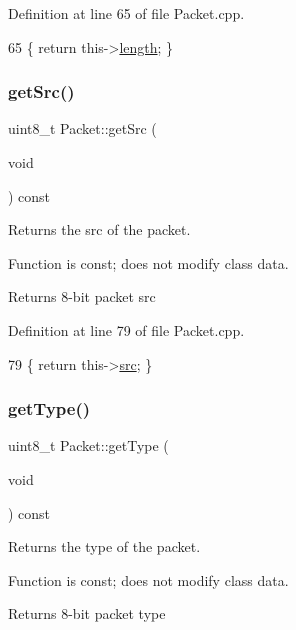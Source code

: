 Definition at line 65 of file Packet.\+cpp.


\begin{DoxyCode}
65 \{ \textcolor{keywordflow}{return} this->\hyperlink{class_packet_adf5f5bae43f927d2977833232f4b9562}{length}; \}
\end{DoxyCode}
\mbox{\label{class_packet_a89ecf51f7edbf2677df7a5961f080b78}} 
\subsubsection{\texorpdfstring{get\+Src()}{getSrc()}}
{\footnotesize\ttfamily uint8\+\_\+t Packet\+::get\+Src (\begin{DoxyParamCaption}\item[{void}]{ }\end{DoxyParamCaption}) const}



Returns the src of the packet. 

Function is const; does not modify class data. \begin{DoxyReturn}{Returns}
8-\/bit packet src 
\end{DoxyReturn}


Definition at line 79 of file Packet.\+cpp.


\begin{DoxyCode}
79 \{ \textcolor{keywordflow}{return} this->\hyperlink{class_packet_a7dc8f5be9690e925a11839c3e7869eef}{src}; \}
\end{DoxyCode}
\mbox{\label{class_packet_affb425d99c0ff69cd5aa42cc0e22de2b}} 
\subsubsection{\texorpdfstring{get\+Type()}{getType()}}
{\footnotesize\ttfamily uint8\+\_\+t Packet\+::get\+Type (\begin{DoxyParamCaption}\item[{void}]{ }\end{DoxyParamCaption}) const}



Returns the type of the packet. 

Function is const; does not modify class data. \begin{DoxyReturn}{Returns}
8-\/bit packet type 
\end{DoxyReturn}



